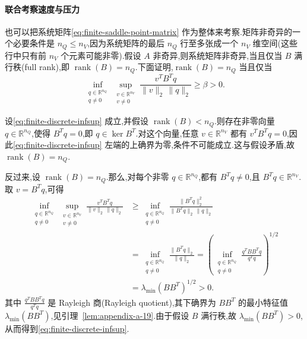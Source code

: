 \paragraph{联合考察速度与压力}
也可以把系统矩阵\cref{eq:finite-saddle-point-matrix} 作为整体来考察.矩阵非奇异的一个必要条件是 $n_Q\le n_V$,因为系统矩阵的最后 $n_Q$ 行至多张成一个 $n_V$ 维空间(这些行中只有前 $n_V$ 个元素可能非零).假设 $A$ 非奇异,则系统矩阵非奇异,当且仅当 $B$ 满行秩(full rank),即 $\operatorname{rank}(B)=n_Q$.下面证明,$\operatorname{rank}(B)=n_Q$ 当且仅当
\begin{equation}\label{eq:finite-discrete-infsup}
  \inf_{\substack{q\in\mathbb{R}^{n_Q}\\q\ne0}}
  \sup_{\substack{v\in\mathbb{R}^{n_V}\\v\ne0}}
  \frac{v^TB^Tq}{\|v\|_2\,\|q\|_2}\ge\beta>0.
\end{equation}

设\cref{eq:finite-discrete-infsup} 成立,并假设 $\operatorname{rank}(B)<n_Q$.则存在非零向量 $q\in\mathbb{R}^{n_Q}$,使得 $B^Tq=0$,即 $q\in\ker B^T$.对这个向量,任意 $v\in\mathbb{R}^{n_V}$ 都有 $v^TB^Tq=0$,因此\cref{eq:finite-discrete-infsup} 左端的上确界为零,条件不可能成立.这与假设矛盾,故 $\operatorname{rank}(B)=n_Q$.

反过来,设 $\operatorname{rank}(B)=n_Q$.那么,对每个非零 $q\in\mathbb{R}^{n_Q}$,都有 $B^Tq\ne0$,且 $B^Tq\in\mathbb{R}^{n_V}$.取 $v=B^Tq$,可得
\begin{equation}\label{eq:finite-infsup-lower-bound}
\begin{aligned}
  \inf_{\substack{q\in\mathbb{R}^{n_Q}\\q\ne0}}
  \sup_{\substack{v\in\mathbb{R}^{n_V}\\v\ne0}}
  \frac{v^TB^Tq}{\|v\|_2\,\|q\|_2}
  &\ge \inf_{\substack{q\in\mathbb{R}^{n_Q}\\q\ne0}}
     \frac{\|B^Tq\|_2^2}{\|B^Tq\|_2\,\|q\|_2}\\
  &=\inf_{\substack{q\in\mathbb{R}^{n_Q}\\q\ne0}}
     \frac{\|B^Tq\|_2}{\|q\|_2}
   =\left(\inf_{\substack{q\in\mathbb{R}^{n_Q}\\q\ne0}}
     \frac{q^TBB^Tq}{q^Tq}\right)^{1/2}\\
   &=\lambda_{\min}(BB^T)^{1/2}>0.
\end{aligned}
\end{equation}
其中 $\frac{q^TBB^Tq}{q^Tq}$ 是 Rayleigh 商(Rayleigh quotient),其下确界为 $BB^T$ 的最小特征值 $\lambda_{\min}(BB^T)$,见引理~\ref{lem:appendix-a-19}.由于假设 $B$ 满行秩,故 $\lambda_{\min}(BB^T)>0$,从而得到\cref{eq:finite-discrete-infsup}.

